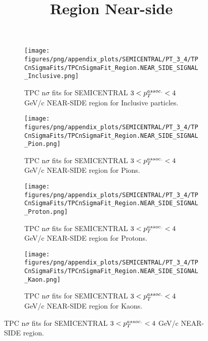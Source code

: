             \begin{figure}[H]
                \title{Region Near-side}
                \begin{subfigure}[b]{0.5\textwidth}
                    \centering
                    \texttt{[image: figures/png/appendix\_plots/SEMICENTRAL/PT\_3\_4/TPCnSigmaFits/TPCnSigmaFit\_Region.NEAR\_SIDE\_SIGNAL\_Inclusive.png]}
                    \caption{TPC n$\sigma$ fits for SEMICENTRAL $3 < \pTassoc < 4$ GeV/c NEAR-SIDE region for Inclusive particles.}
                    \label{fig:appendix_SEMICENTRAL_$3 < \pTassoc < 4$ GeV/c_NEAR_SIDE_SIGNAL_Inclusive}
                \end{subfigure}
                \begin{subfigure}[b]{0.5\textwidth}
                    \centering
                    \texttt{[image: figures/png/appendix\_plots/SEMICENTRAL/PT\_3\_4/TPCnSigmaFits/TPCnSigmaFit\_Region.NEAR\_SIDE\_SIGNAL\_Pion.png]}
                    \caption{TPC n$\sigma$ fits for SEMICENTRAL $3 < \pTassoc < 4$ GeV/c NEAR-SIDE region for Pions.}
                    \label{fig:appendix_SEMICENTRAL_$3 < \pTassoc < 4$ GeV/c_NEAR_SIDE_SIGNAL_Pion}
                \end{subfigure}
                \begin{subfigure}[b]{0.5\textwidth}
                    \centering
                    \texttt{[image: figures/png/appendix\_plots/SEMICENTRAL/PT\_3\_4/TPCnSigmaFits/TPCnSigmaFit\_Region.NEAR\_SIDE\_SIGNAL\_Proton.png]}
                    \caption{TPC n$\sigma$ fits for SEMICENTRAL $3 < \pTassoc < 4$ GeV/c NEAR-SIDE region for Protons.}
                    \label{fig:appendix_SEMICENTRAL_$3 < \pTassoc < 4$ GeV/c_NEAR_SIDE_SIGNAL_Proton}
                \end{subfigure}
                \begin{subfigure}[b]{0.5\textwidth}
                    \centering
                    \texttt{[image: figures/png/appendix\_plots/SEMICENTRAL/PT\_3\_4/TPCnSigmaFits/TPCnSigmaFit\_Region.NEAR\_SIDE\_SIGNAL\_Kaon.png]}
                    \caption{TPC n$\sigma$ fits for SEMICENTRAL $3 < \pTassoc < 4$ GeV/c NEAR-SIDE region for Kaons.}
                    \label{fig:appendix_SEMICENTRAL_$3 < \pTassoc < 4$ GeV/c_NEAR_SIDE_SIGNAL_Kaon}
                \end{subfigure}
                \caption{TPC n$\sigma$ fits for SEMICENTRAL $3 < \pTassoc < 4$ GeV/c NEAR-SIDE region.}
                \label{fig:appendix_SEMICENTRAL_$3 < \pTassoc < 4$ GeV/c_NEAR_SIDE_SIGNAL}
            \end{figure}
